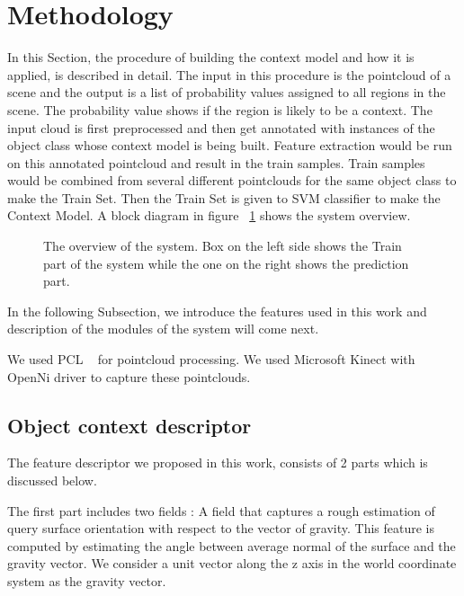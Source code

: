 \section{Methodology}
\label{Implementation.sec}

In this Section, the procedure of building the context model and how it is applied, is described in detail. 
The input in this procedure is the pointcloud of a scene and the output is a list of probability values assigned to all regions in
the scene. 
The probability value shows if the region is likely to be a context. 
The input cloud is first preprocessed and then get annotated with instances of the object class whose context model is being built. 
Feature extraction would be run on this annotated pointcloud and result in the train samples. 
Train samples would be combined from several different pointclouds for the same object class to make the Train Set. 
Then the Train Set is given to SVM classifier to make the Context Model. A block diagram in figure ~\ref{SystemOverview.figure} shows 
the system overview.

\begin{figure}[t]
  \caption[System Overview]
  {The overview of the system. Box on the left side shows the Train part of the system while the one on the right shows the prediction part.}
  \label{SystemOverview.figure}
\end{figure}

In the following Subsection, we introduce the features used in this work and description of the modules of the system 
will come next.

We used PCL ~\cite{Rusu_ICRA2011_PCL} for pointcloud processing. 
We used Microsoft Kinect with OpenNi driver to capture these pointclouds. 

\subsection{Object context descriptor}
\label{OCD.ssec}

The feature descriptor we proposed in this work, consists of 2 parts which is discussed below.

The first part includes two fields :
A field that captures a rough estimation of query surface orientation with respect to the vector of gravity.
This feature is computed by estimating the angle between average normal of the surface and the gravity vector.
We consider a unit vector along the z axis in the world coordinate system as the gravity vector.

